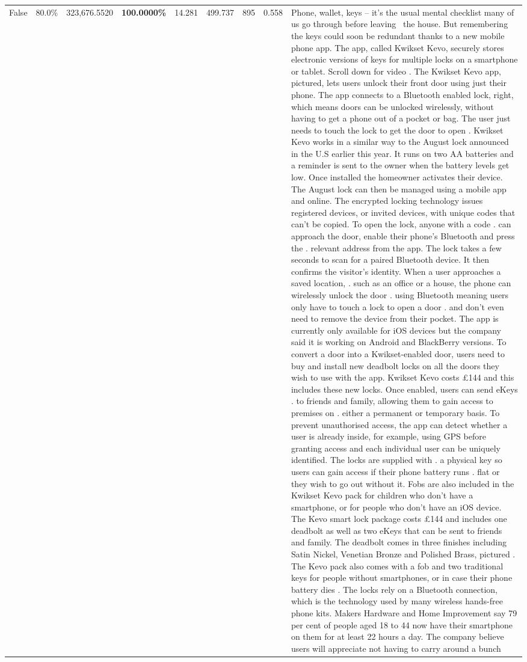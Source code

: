 \begin{table}[H]
\begin{tabular}{lllrlllll}
False & 80.0\% & 323,676.5520 & \bfseries \color{red} 100.0000\% & 14.281 & 499.737 & 895 & 0.558 & Phone, wallet, keys – it’s the usual mental checklist many of us go through before leaving  the house. But remembering the keys could soon be redundant thanks to a new mobile phone app. The app, called Kwikset Kevo, securely stores electronic versions of keys for multiple locks on a smartphone or tablet. Scroll down for video . The Kwikset Kevo app, pictured, lets users unlock their front door using just their phone. The app connects to a Bluetooth enabled lock, right, which means doors can be unlocked wirelessly, without having to get a phone out of a pocket or bag. The user just needs to touch the lock to get the door to open . Kwikset Kevo works in a similar way to the August lock announced in the U.S earlier this year. It runs on two AA batteries and a reminder is sent to the owner when the battery levels get low. Once installed the homeowner activates their device. The August lock can then be managed using a mobile app and online. The encrypted locking technology issues registered devices, or invited devices, with unique codes that can't be copied. To open the lock, anyone with a code . can approach the door, enable their phone's Bluetooth and press the . relevant address from the app. The lock takes a few seconds to scan for a paired Bluetooth device. It then confirms the visitor's identity. When a user approaches a saved location, . such as an office or a house, the phone can wirelessly unlock the door . using Bluetooth meaning users only have to touch a lock to open a door . and don't even need to remove the device from their pocket. The app is currently only available for iOS devices but the company said it is working on Android and BlackBerry versions. To convert a door into a Kwikset-enabled door, users need to buy and install new deadbolt locks on all the doors they wish to use with the app. Kwikset Kevo costs £144 and this includes these new locks. Once enabled, users can send eKeys . to friends and family, allowing them to gain access to premises on . either a permanent or temporary basis. To prevent unauthorised access, the app can detect whether a user is already inside, for example, using GPS before granting access and each individual user can be uniquely identified. The locks are supplied with . a physical key so users can gain access if their phone battery runs . flat or they wish to go out without it. Fobs are also included in the Kwikset Kevo pack for children who don't have a smartphone, or for people who don't have an iOS device. The Kevo smart lock package costs £144 and includes one deadbolt as well as two eKeys that can be sent to friends and family. The deadbolt comes in three finishes including Satin Nickel, Venetian Bronze and Polished Brass, pictured . The Kevo pack also comes with a fob and two traditional keys for people without smartphones, or in case their phone battery dies . The locks rely on a Bluetooth connection, which is the technology used by many wireless hands-free phone kits. Makers Hardware and Home Improvement say 79 per cent of people aged 18 to 44 now have their smartphone on them for at least 22 hours a day. The company believe users will appreciate not having to carry around a bunch 
\end{tabular}
\end{table}
